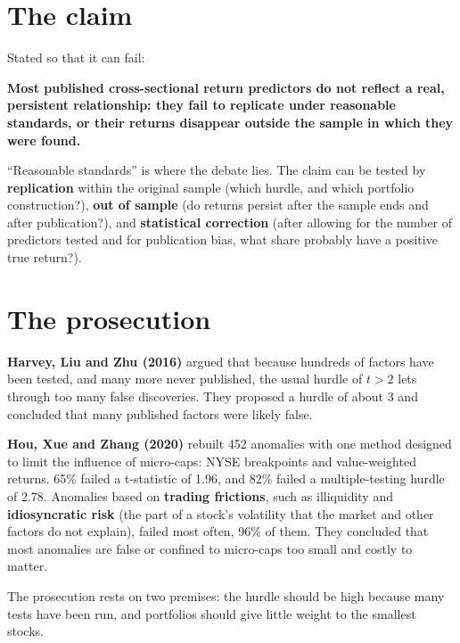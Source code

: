 \section{The claim}
\label{sec:19-claim}

Stated so that it can fail:

\begin{callout}
\textbf{Most published cross-sectional return predictors do not reflect a real, persistent relationship: they fail to replicate under reasonable standards, or their returns disappear outside the sample in which they were found.}
\end{callout}

``Reasonable standards'' is where the debate lies. The claim can be tested by \textbf{replication} within the original sample (which hurdle, and which portfolio construction?), \textbf{out of sample} (do returns persist after the sample ends and after publication?), and \textbf{statistical correction} (after allowing for the number of predictors tested and for publication bias, what share probably have a positive true return?).

\section{The prosecution}
\label{sec:19-prosecution}

\textbf{Harvey, Liu and Zhu (2016)} argued that because hundreds of factors have been tested, and many more never published, the usual hurdle of $t > 2$ lets through too many false discoveries. They proposed a hurdle of about 3 and concluded that many published factors were likely false.

\textbf{Hou, Xue and Zhang (2020)} rebuilt 452 anomalies with one method designed to limit the influence of micro-caps: NYSE breakpoints and value-weighted returns. 65\% failed a t-statistic of 1.96, and 82\% failed a multiple-testing hurdle of 2.78. Anomalies based on \textbf{trading frictions}, such as illiquidity and \textbf{idiosyncratic risk} (the part of a stock's volatility that the market and other factors do not explain), failed most often, 96\% of them. They concluded that most anomalies are false or confined to micro-caps too small and costly to matter.

The prosecution rests on two premises: the hurdle should be high because many tests have been run, and portfolios should give little weight to the smallest stocks.

